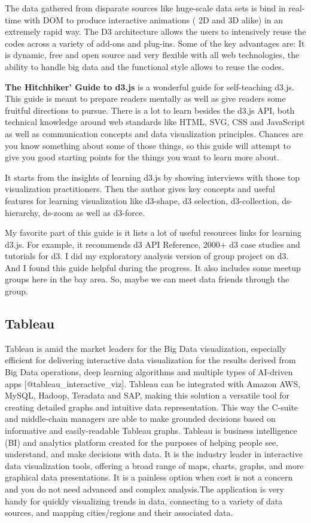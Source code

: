 \documentclass[]{book}
\theoremstyle{definition}
\theoremstyle{definition}
\theoremstyle{definition}
\theoremstyle{remark}
\begin{document}
The data gathered from disparate sources like huge-scale data sets is
bind in real-time with DOM to produce interactive animations ( 2D and 3D
alike) in an extremely rapid way. The D3 architecture allows the users
to intensively reuse the codes across a variety of add-ons and plug-ins.
Some of the key advantages are: It is dynamic, free and open source and
very flexible with all web technologies, the ability to handle big data
and the functional style allows to reuse the codes.

\textbf{The Hitchhiker' Guide to d3.js} is a wonderful guide for
self-teaching d3.js. This guide is meant to prepare readers mentally as
well as give readers some fruitful directions to pursue. There is a lot
to learn besides the d3.js API, both technical knowledge around web
standards like HTML, SVG, CSS and JavaScript as well as communication
concepts and data visualization principles. Chances are you know
something about some of those things, so this guide will attempt to give
you good starting points for the things you want to learn more about.

It starts from the insights of learning d3.js by showing interviews with
those top visualization practitioners. Then the author gives key
concepts and useful features for learning visualization like d3-shape,
d3 selection, d3-collection, ds-hierarchy, ds-zoom as well as d3-force.

My favorite part of this guide is it lists a lot of useful resources
links for learning d3.js. For example, it recommends d3 API Reference,
2000+ d3 case studies and tutorials for d3. I did my exploratory
analysis version of group project on d3. And I found this guide helpful
during the progress. It also includes some meetup groups here in the bay
area. So, maybe we can meet data friends through the group.

\subsection{Tableau}\label{tableau}

Tableau is amid the market leaders for the Big Data visualization,
especially efficient for delivering interactive data visualization for
the results derived from Big Data operations, deep learning algorithms
and multiple types of AI-driven apps {[}@tableau\_interactive\_viz{]}.
Tableau can be integrated with Amazon AWS, MySQL, Hadoop, Teradata and
SAP, making this solution a versatile tool for creating detailed graphs
and intuitive data representation. This way the C-suite and middle-chain
managers are able to make grounded decisions based on informative and
easily-readable Tableau graphs. Tableau is business intelligence (BI)
and analytics platform created for the purposes of helping people see,
understand, and make decisions with data. It is the industry leader in
interactive data visualization tools, offering a broad range of maps,
charts, graphs, and more graphical data presentations. It is a painless
option when cost is not a concern and you do not need advanced and
complex analysis.The application is very handy for quickly visualizing
trends in data, connecting to a variety of data sources, and mapping
cities/regions and their associated data.
\end{document}
